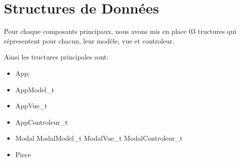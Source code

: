 \section{Structures de Données}\label{structures}

Pour chaque composants principaux, nous avons mis en place 03 tructures qui répresentent pour chacun,
leur modèle, vue et controleur.

Ainsi les tructures principales sont:
\begin{itemize}
    \item App:
        \item AppModel_t
        \item AppVue_t
        \item AppControleur_t
    \item Modal
        \iitem ModalModel_t
        \iitem ModalVue_t
        \iitem ModalControleur_t
    \item Piece
\end{itemize}